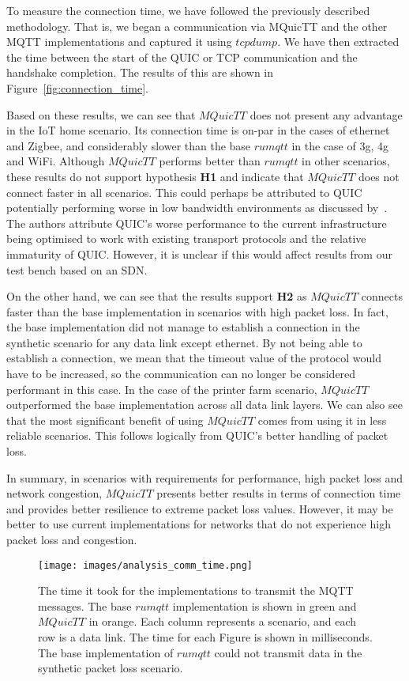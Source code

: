 To measure the connection time, we have followed the previously described methodology.
That is, we began a communication via MQuicTT and the other MQTT implementations and captured it using $tcpdump$.
We have then extracted the time between the start of the QUIC or TCP communication and the handshake completion.
The results of this are shown in Figure~\ref{fig:connection_time}.

Based on these results, we can see that $MQuicTT$ does not present any advantage in the IoT home scenario.
Its connection time is on-par in the cases of ethernet and Zigbee, and considerably slower than the base $rumqtt$ in the case of 3g, 4g and WiFi.
Although $MQuicTT$ performs better than $rumqtt$ in other scenarios, these results do not support hypothesis \textbf{H1} and indicate that $MQuicTT$ does not connect faster in all scenarios.
This could perhaps be attributed to QUIC potentially performing worse in low bandwidth environments as discussed by~\citet{Nepomuceno2018}.
The authors attribute QUIC's worse performance to the current infrastructure being optimised to work with existing transport protocols and the relative immaturity of QUIC.
However, it is unclear if this would affect results from our test bench based on an SDN.

On the other hand, we can see that the results support \textbf{H2} as $MQuicTT$ connects faster than the base implementation in scenarios with high packet loss.
In fact, the base implementation did not manage to establish a connection in the synthetic scenario for any data link except ethernet.
By not being able to establish a connection, we mean that the timeout value of the protocol would have to be increased, so the communication can no longer be considered performant in this case.
In the case of the printer farm scenario, $MQuicTT$ outperformed the base implementation across all data link layers.
We can also see that the most significant benefit of using $MQuicTT$ comes from using it in less reliable scenarios.
This follows logically from QUIC's better handling of packet loss.

In summary, in scenarios with requirements for performance, high packet loss and network congestion, $MQuicTT$ presents better results in terms of connection time and provides better resilience to extreme packet loss values.
However, it may be better to use current implementations for networks that do not experience high packet loss and congestion.

\begin{figure}
    \centering
    \texttt{[image: images/analysis\_comm\_time.png]}
    \caption{The time it took for the implementations to transmit the MQTT messages.
        The base $rumqtt$ implementation is shown in green and $MQuicTT$ in orange.
        Each column represents a scenario, and each row is a data link.
        The time for each Figure is shown in milliseconds. The base implementation of $rumqtt$ could not transmit data in the synthetic packet loss scenario.}
    \label{fig:comm_time}
\end{figure}
